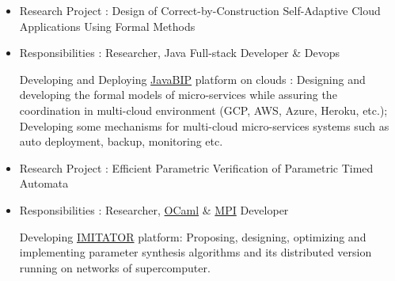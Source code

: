 \documentclass[10pt,a4paper,ragged2e]{altacv}
\begin{document}
	\begin{itemize}
		\item Research Project : Design of Correct-by-Construction Self-Adaptive Cloud Applications Using Formal Methods
		
		\item Responsibilities : Researcher, Java Full-stack Developer \& Devops
		
		Developing and Deploying \href{https://github.com/sbliudze/javabip-core}{JavaBIP} platform on clouds : 
		Designing and developing the formal models of micro-services while assuring the coordination in multi-cloud environment (GCP, AWS, Azure, Heroku, etc.); 
		Developing some mechanisms for multi-cloud micro-services systems such as auto deployment, backup, monitoring etc.  
	\end{itemize}

	
	
	\divider
	
	
%		
	\begin{itemize}
		\item Research Project : Efficient Parametric Verification of Parametric Timed Automata
		\item Responsibilities : Researcher, \href{https://ocaml.org/}{OCaml} \& \href{https://computing.llnl.gov/tutorials/mpi/}{MPI} Developer
		
		Developing \href{https://www.imitator.fr/}{IMITATOR} platform: 
		Proposing, designing, optimizing and implementing parameter synthesis algorithms and its distributed version running on networks of supercomputer. 
	\end{itemize}
	
\end{document}
